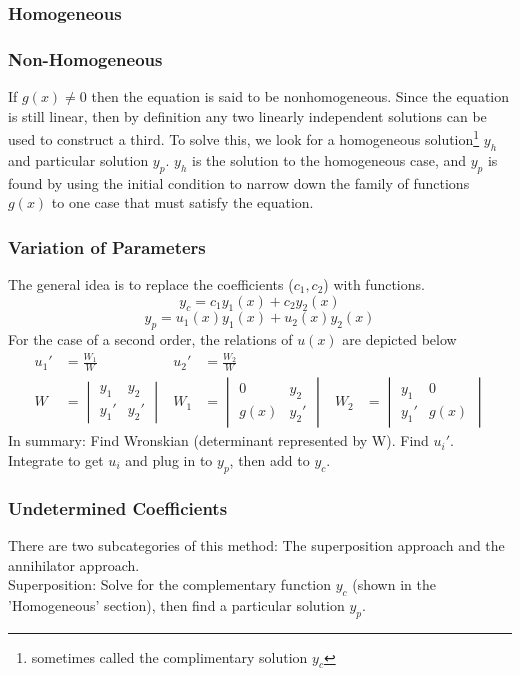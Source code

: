     \subsubsection{Homogeneous}
    \subsubsection{Non-Homogeneous}
        If $g(x)\neq0$ then the equation is said to be nonhomogeneous. Since the equation is still linear, then by definition any two linearly independent solutions can be used to construct a third. To solve this, we look for a homogeneous solution\footnote{sometimes called the complimentary solution $y_c$} $y_h$ and particular solution $y_p$. $y_h$ is the solution to the homogeneous case, and $y_p$ is found by using the initial condition to narrow down the family of functions $g(x)$ to one case that must satisfy the equation.

    \subsubsection{Variation of Parameters}
        The general idea is to replace the coefficients ($c_1,c_2$) with functions. 
        $$y_c=c_1y_1(x)+c_2y_2(x)$$
        $$y_p=u_1(x)y_1(x)+u_2(x)y_2(x)$$
        For the case of a second order, the relations of $u(x)$ are depicted below
        \begin{align*}
            u_1'&=\frac{W_1}{W} & u_2'&=\frac{W_2}{W}\\[0.7 cm]
            W&=
            \begin{vmatrix}
            y_1 & y_2 \\
            y_1'& y_2'
            \end{vmatrix}
            &
            W_1&=
            \begin{vmatrix}
            0 & y_2 \\
            g(x)& y_2'
            \end{vmatrix}
            &
            W_2&=
            \begin{vmatrix}
            y_1 & 0 \\
            y_1'& g(x)
            \end{vmatrix}
        \end{align*}
        In summary: Find Wronskian (determinant represented by W). Find $u_i'$. Integrate to get $u_i$ and plug in to $y_p$, then add to $y_c$.

    \subsubsection{Undetermined Coefficients}
        There are two subcategories of this method: The superposition approach and the annihilator approach.\\
        Superposition: Solve for the complementary function $y_c$ (shown in the 'Homogeneous' section), then find a particular solution $y_p$.
